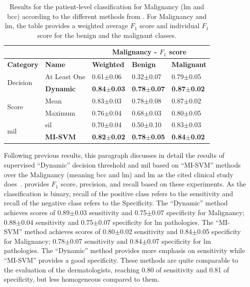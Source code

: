 \documentclass[journal,article,accept,moreauthors,pdftex, applsci]{Definitions/mdpi}
\newcommand{\fscore}{$F_{1}$ score}
\begin{document}
\begin{table}[H]
    \centering
    \begin{tabular}{lllll}
                                &                   & \multicolumn{3}{c}{\textbf{Malignancy - \fscore{}}}                    \\ \hline
    \textbf{Category}           & \textbf{Name}     & \textbf{Weighted}     & \textbf{Benign}       & \textbf{Malignant}    \\ \hline
    \multirow{2}{*}{Decision}   & At Least One      & 0.61$\pm$0.06         & 0.32$\pm$0.07         & 0.79$\pm$0.05         \\ \cline{2-5} 
                                & \textbf{Dynamic}  & \textbf{0.84$\pm$0.03}& \textbf{0.78$\pm$0.07}& \textbf{0.87$\pm$0.02}\\ \hline 
    \multirow{2}{*}{Score}      & Mean              & 0.83$\pm$0.03         & 0.78$\pm$0.08         & 0.87$\pm$0.02         \\ \cline{2-5}
                                & Maximum           & 0.76$\pm$0.04         & 0.68$\pm$0.03         & 0.80$\pm$0.05         \\ \hline  
    \multirow{2}{*}{\ac{mil}}   & \ac{sil}          & 0.70$\pm$0.04         & 0.50$\pm$0.10         & 0.83$\pm$0.03         \\ \cline{2-5} 
                                & \textbf{MI-SVM}   & \textbf{0.82$\pm$0.02}& \textbf{0.78$\pm$0.05}& \textbf{0.84$\pm$0.02}\\ \hline 
    \end{tabular}    
    \caption{Results for the patient-level classification for Malignancy (\ac{lm} and \ac{bcc}) according to the different methods from . For Malignancy and \ac{lm}, the table provides a weighted average \fscore{} and individual \fscore{} for the benign and the malignant classes.}
    \label{tab:patient_results}
\end{table}\par
Following previous results, this paragraph discusses in detail the results of supervised “Dynamic” decision threshold and \ac{mil} based on “MI-SVM” methods over the Malignancy (meaning \ac{bcc} and \ac{lm}) and \ac{lm} as the cited clinical study does~\cite{Cinotti2018}.  provides \fscore{}, precision, and recall based on these experiments. As the classification is binary, recall of the positive class refers to the sensitivity and recall of the negative class refers to the Specificity. The “Dynamic” method achieves scores of 0.89$\pm$0.03 sensitivity and 0.75$\pm$0.07 specificity for Malignancy; 0.88$\pm$0.04 sensitivity and 0.75$\pm$0.07 specificity for \ac{lm} pathologies. The “MI-SVM” method achieves scores of 0.80$\pm$0.02 sensitivity and 0.84$\pm$0.05 specificity for Malignancy; 0.78$\pm$0.07 sensitivity and 0.84$\pm$0.07 specificity for \ac{lm} pathologies. The “Dynamic” method provides more emphasis on sensitivity while “MI-SVM” provides a good specificity. These methods are quite comparable to the evaluation of the dermatologists, reaching 0.80 of sensitivity and 0.81 of specificity, but less homogeneous compared to them.\par
\end{document}
